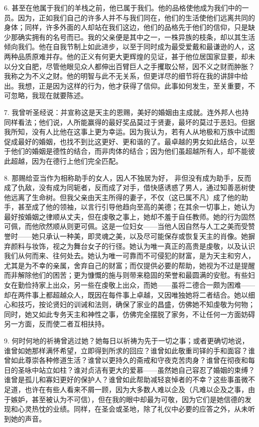 6. 甚至在他属于我们的羊栈之前，他已属于我们。他的品格使他成为我们中的一员。因为，正如我们自己的许多人并不与我们同在，他们的生活使他们远离共同的身体；同样，许多外面的人却站在我们这边，他们的品格先于他们的信仰，只是缺少那确实拥有的名号而已。我的父亲便是其中之一，一株异族的枝条，却以其生活倾向我们。他在自我节制上如此进步，以至于同时成为最受爱戴和最谦逊的人，这两种品质原难并存。他的正义有何更大更辉煌的见证，甚于他位居国家显要，却未以分文自肥，尽管他眼见众人都伸出百臂巨人之手攫取公帑，因不义之财而肿胀？我称之为不义之财。他的明智与此不无关系，但更详尽的细节将在我的讲辞中给出。我想，正是因为这样的行为，他才获得了信仰。此事如何发生，至关重要，不可忽略，我现在就要陈述。\par

7. 我曾听圣经说：并宣称这是天主的恩赐，美好的婚姻由主成就。连外邦人也持同样看法；他们说，人所能赢得的最好奖品莫过于贤妻，最坏的莫过于恶妇。但据我所知，没有人比他在这事上更为幸运。因为我认为，若有人从地极和万族中试图促成最好的婚姻，也找不到比这更好、更和谐的了。最卓越的男女如此结合，以至于他们的婚姻是德性的结合，而非肉体的结合；因为他们虽超越所有人，却不能彼此超越，因为在德行上他们完全匹配。\par

8. 那赐给亚当作为相称助手的女人，因人不独居为好，\newline{} 非但没有成为助手，反而成了仇敌，没有成为同轭者，反而成了对手，借快感诱惑了男人，通过知善恶树使他远离了生命树。但我父亲由天主所得的妻子，不仅（这已属不凡）成了他的助手，甚至成了他的领袖，以言行引导他趋向至高的美德；在其余一切事上，她认为最好按婚姻之律顺从丈夫，但在虔敬之事上，她却不羞于自任教师。她的行为固然可佩，而他欣然顺从则更可佩。这是一位妇女——当他人因自然与人工之美而受赞誉时——她只承认一种美，即灵魂之美，以及尽可能保存或恢复天主的肖像。她摒弃颜料与妆饰，视之为舞台女子的行径。她认为唯一真正的高贵是虔敬，以及认识我们从何而来、往何处去。她认为唯一可靠而不可侵犯的财富，是为天主和穷人，尤其是为不幸的亲属，舍弃自己的财富；而仅提供必要的帮助，她视为不过是提醒而非解除他们的困苦；更为慷慨的施与则带来稳固的荣誉和最圆满的安慰。有些妇女在勤俭持家上出众，另一些在虔敬上出众，而她——虽将二德合一颇为困难——却在两件事上都超越众人，既因在每件事上卓越，又因唯独她将二者结合。她以细心和技巧，按论贤妇的训诫和法则，确保了家业的昌盛，仿佛她不知虔敬为何物；同时，她又如此专务天主和神性之事，仿佛完全摆脱了家务，不让任何一方面妨碍另一方面，反而使二者互相扶持。\par

9. 何时何地的祈祷曾逃过她？她每日以祈祷为先于一切之事；或者更确切地说，谁曾如她那样满怀希望，立即得到所求的回应？谁曾如此敬重司铎的手和面容？谁曾如此尊崇各种修道生活？谁曾以更持久的斋戒和守夜克苦肉身？谁曾在彻夜和每日的圣咏中站立如柱？谁对贞洁有更大的爱慕——虽然她自己容忍了婚姻的束缚？谁曾是孤儿和寡妇更好的保护人？谁曾如此帮助减轻哀悼者的不幸？这些事虽微不足道，也许在有些人看来不屑一顾，因为大多数人难以企及（凡难以企及之事，由于嫉妒，甚至被认为不可信），但在我的眼中却最为可敬，因为它们是她信德的发现和心灵热忱的业绩。同样，在圣会或圣地，除了礼仪中必要的应答之外，从未听到她的声音。\par

